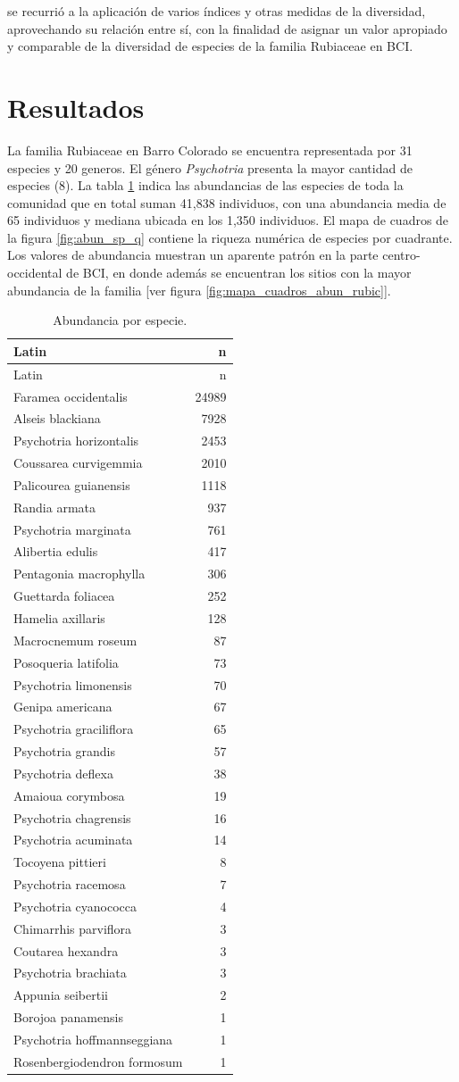 \documentclass[11pt,]{article}
\begin{document}
se recurrió a la aplicación de varios índices y otras medidas de la
diversidad, aprovechando su relación entre sí, con la finalidad de
asignar un valor apropiado y comparable de la diversidad de especies de
la familia Rubiaceae en BCI.

\section{Resultados}\label{resultados}

La familia Rubiaceae en Barro Colorado se encuentra representada por 31
especies y 20 generos. El género \emph{Psychotria} presenta la mayor
cantidad de especies (8). La tabla \ref{tab:abun_sp} indica las
abundancias de las especies de toda la comunidad que en total suman
41,838 individuos, con una abundancia media de 65 individuos y mediana
ubicada en los 1,350 individuos. El mapa de cuadros de la figura
\ref{fig:abun_sp_q} contiene la riqueza numérica de especies por
cuadrante. Los valores de abundancia muestran un aparente patrón en la
parte centro-occidental de BCI, en donde además se encuentran los sitios
con la mayor abundancia de la familia {[}ver figura
\ref{fig:mapa_cuadros_abun_rubic}{]}.

\begin{longtable}[]{@{}lr@{}}
\caption{\label{tab:abun_sp}Abundancia por especie.}\tabularnewline
\toprule
Latin & n\tabularnewline
\midrule
\endfirsthead
\toprule
Latin & n\tabularnewline
\midrule
\endhead
Faramea occidentalis & 24989\tabularnewline
Alseis blackiana & 7928\tabularnewline
Psychotria horizontalis & 2453\tabularnewline
Coussarea curvigemmia & 2010\tabularnewline
Palicourea guianensis & 1118\tabularnewline
Randia armata & 937\tabularnewline
Psychotria marginata & 761\tabularnewline
Alibertia edulis & 417\tabularnewline
Pentagonia macrophylla & 306\tabularnewline
Guettarda foliacea & 252\tabularnewline
Hamelia axillaris & 128\tabularnewline
Macrocnemum roseum & 87\tabularnewline
Posoqueria latifolia & 73\tabularnewline
Psychotria limonensis & 70\tabularnewline
Genipa americana & 67\tabularnewline
Psychotria graciliflora & 65\tabularnewline
Psychotria grandis & 57\tabularnewline
Psychotria deflexa & 38\tabularnewline
Amaioua corymbosa & 19\tabularnewline
Psychotria chagrensis & 16\tabularnewline
Psychotria acuminata & 14\tabularnewline
Tocoyena pittieri & 8\tabularnewline
Psychotria racemosa & 7\tabularnewline
Psychotria cyanococca & 4\tabularnewline
Chimarrhis parviflora & 3\tabularnewline
Coutarea hexandra & 3\tabularnewline
Psychotria brachiata & 3\tabularnewline
Appunia seibertii & 2\tabularnewline
Borojoa panamensis & 1\tabularnewline
Psychotria hoffmannseggiana & 1\tabularnewline
Rosenbergiodendron formosum & 1\tabularnewline
\bottomrule
\end{longtable}
\end{document}
